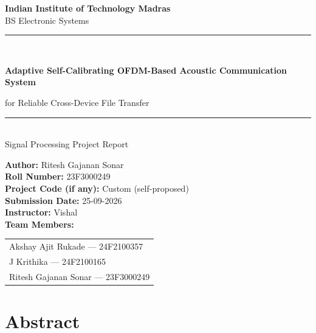 \documentclass[11pt,a4paper]{report}
\begin{document}
\begin{titlepage}
    \centering
    \vspace*{1cm}

    {\Large \textbf{Indian Institute of Technology Madras}}\\[0.3cm]
    {\large BS Electronic Systems}\\[2cm]

    \rule{\linewidth}{0.5mm}\\[0.5cm]
    {\Huge \textbf{Adaptive Self-Calibrating OFDM-Based Acoustic Communication System}\par}
    \vspace{0.4cm}
    {\Large for Reliable Cross-Device File Transfer}\\
    \rule{\linewidth}{0.5mm}\\[2cm]

    {\large Signal Processing Project Report}\\[2cm]

    \begin{flushleft}
    \textbf{Author:} Ritesh Gajanan Sonar\\[0.3cm]
    \textbf{Roll Number:} 23F3000249\\[0.3cm]
    \textbf{Project Code (if any):} Custom (self-proposed)\\[0.3cm]
    \textbf{Submission Date:} 25-09-2026\\[0.3cm]
    \textbf{Instructor:} Vishal\\[0.3cm]
    \textbf{Team Members:} \begin{tabular}[t]{@{}l@{}}Akshay Ajit Rukade --- 24F2100357 \\ J Krithika --- 24F2100165 \\ Ritesh Gajanan Sonar --- 23F3000249\end{tabular}
    \end{flushleft}

    \vfill
\end{titlepage}

\tableofcontents
\newpage

\chapter*{Abstract}
\end{document}
